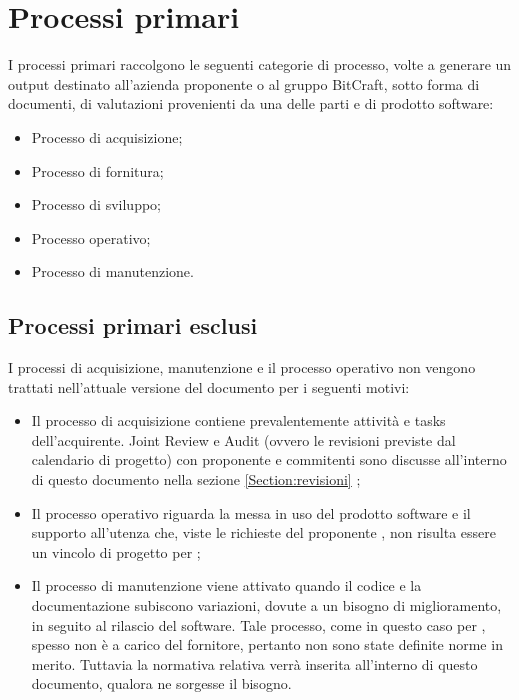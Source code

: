 \section{Processi primari}\label{section:Processi primari}
I processi primari raccolgono le seguenti categorie di processo, volte a generare un output destinato all'azienda proponente o al gruppo BitCraft, sotto forma di documenti, di valutazioni provenienti da una delle parti e di prodotto software:
\begin{itemize}
	\item Processo di acquisizione;
	\item Processo di fornitura;
	\item Processo di sviluppo;
	\item Processo operativo;
	\item Processo di manutenzione.
\end{itemize}

\subsection{Processi primari esclusi}
I processi di acquisizione, manutenzione e il processo operativo non vengono trattati nell'attuale versione del documento per i seguenti motivi:
\begin{itemize}
	\item Il processo di acquisizione contiene prevalentemente attività e tasks dell'acquirente. Joint Review e Audit (ovvero le revisioni previste dal calendario di progetto) con proponente e commitenti sono discusse all'interno di questo documento nella sezione \ref{Section:revisioni} ;
	\item Il processo operativo riguarda la messa in uso del prodotto software e il supporto all'utenza che, viste le richieste del proponente \proposerName{}, non risulta essere un vincolo di progetto per \groupName{};
	\item Il processo di manutenzione viene attivato quando il codice e la documentazione subiscono variazioni, dovute a un bisogno di miglioramento, in seguito al rilascio del software. Tale processo, come in questo caso per \projectName{}, spesso non è a carico del fornitore, pertanto non sono state definite norme in merito. Tuttavia la normativa relativa verrà inserita all'interno di questo documento, qualora ne sorgesse il bisogno.
\end{itemize}
